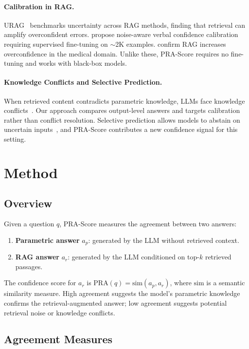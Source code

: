 \documentclass{article}
\begin{document}
\paragraph{Calibration in RAG.}
URAG~\citep{nguyen2026urag} benchmarks uncertainty across RAG methods, finding that retrieval can amplify overconfident errors. \citet{liu2026naacl} propose noise-aware verbal confidence calibration requiring supervised fine-tuning on ${\sim}$2K examples. \citet{ozaki2025understanding} confirm RAG increases overconfidence in the medical domain. Unlike these, PRA-Score requires no fine-tuning and works with black-box models.

\paragraph{Knowledge Conflicts and Selective Prediction.}
When retrieved content contradicts parametric knowledge, LLMs face knowledge conflicts~\citep{xu2024knowledge}. Our approach compares output-level answers and targets calibration rather than conflict resolution. Selective prediction allows models to abstain on uncertain inputs~\citep{kamath2020selective,wen2025abstention}, and PRA-Score contributes a new confidence signal for this setting.

\section{Method}
\label{sec:method}

\subsection{Overview}

Given a question $q$, PRA-Score measures the agreement between two answers:
\begin{enumerate}
    \item \textbf{Parametric answer} $a_p$: generated by the LLM without retrieved context.
    \item \textbf{RAG answer} $a_r$: generated by the LLM conditioned on top-$k$ retrieved passages.
\end{enumerate}
The confidence score for $a_r$ is $\text{PRA}(q) = \text{sim}(a_p, a_r)$, where $\text{sim}$ is a semantic similarity measure. High agreement suggests the model's parametric knowledge confirms the retrieval-augmented answer; low agreement suggests potential retrieval noise or knowledge conflicts.

\subsection{Agreement Measures}
\end{document}
